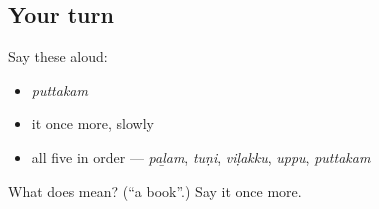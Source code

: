 \subsection*{Your turn}
Say these aloud:

\begin{itemize}
\raggedright
  \item \emph{puttakam}
  \item it once more, slowly
  \item all five in order — \emph{paḻam}, \emph{tuṇi}, \emph{viḷakku}, \emph{uppu}, \emph{puttakam}
\end{itemize}

\begin{tcolorbox}[breakable,colback=teal!4,colframe=teal!35!black,title={Before you move on}]
What does  mean? (\textquotedblleft{}a book\textquotedblright{}.) Say it once more.
\end{tcolorbox}
